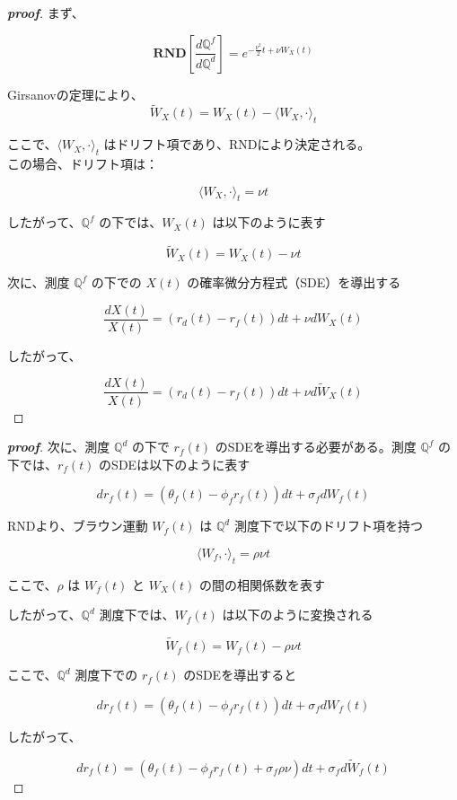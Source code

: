 \documentclass[a4paper,11pt]{jsarticle}
\begin{document}
\begin{proof}[\textbf{proof}]

まず、

\[  
\mathbf{RND}[\frac{d\mathbb{Q}^f}{d\mathbb{Q}^d}] = e^{-\frac{\nu^2}{2}t+\nu W_X(t)}  
\]  

Girsanovの定理により、
\[  
\tilde{W}_X(t) = W_X(t) - \langle W_X,\cdot\rangle_t  
\]  

ここで、$\langle W_X,\cdot\rangle_t$ はドリフト項であり、RNDにより決定される。\\
この場合、ドリフト項は：  

\[  
\langle W_X,\cdot\rangle_t = \nu t  
\]  

したがって、$\mathbb{Q}^f$ の下では、$W_X(t)$ は以下のように表す  

\[  
\tilde{W}_X(t) = W_X(t) - \nu t  
\]  

次に、測度 $\mathbb{Q}^f$ の下での $X(t)$ の確率微分方程式（SDE）を導出する  

\[  
\frac{dX(t)}{X(t)} = (r_d(t) - r_f(t))dt + \nu dW_X(t)  
\]  

したがって、

\[  
\frac{dX(t)}{X(t)} = (r_d(t) - r_f(t))dt + \nu d\tilde{W}_X(t)  
\]

  
\end{proof}


\begin{proof}[\textbf{proof}]
 

次に、測度 $\mathbb{Q}^d$ の下で $r_f(t)$ のSDEを導出する必要がある。測度 $\mathbb{Q}^f$ の下では、$r_f(t)$ のSDEは以下のように表す  

\[  
dr_f(t) = (\theta_f(t) - \phi_f r_f(t))dt + \sigma_f dW_f(t)  
\]  


RNDより、ブラウン運動 $W_f(t)$ は $\mathbb{Q}^d$ 測度下で以下のドリフト項を持つ  

\[  
\langle W_f,\cdot\rangle_t = \rho\nu t  
\]  

ここで、$\rho$ は $W_f(t)$ と $W_X(t)$ の間の相関係数を表す

したがって、$\mathbb{Q}^d$ 測度下では、$W_f(t)$ は以下のように変換される  

\[  
\tilde{W}_f(t) = W_f(t) - \rho\nu t  
\]  

ここで、$\mathbb{Q}^d$ 測度下での $r_f(t)$ のSDEを導出すると 

\[  
dr_f(t) = (\theta_f(t) - \phi_f r_f(t))dt + \sigma_f dW_f(t)  
\]  

したがって、  

\[  
dr_f(t) = (\theta_f(t) - \phi_f r_f(t) + \sigma_f\rho\nu)dt + \sigma_f d\tilde{W}_f(t)  
\]
\end{proof}
\end{document}
